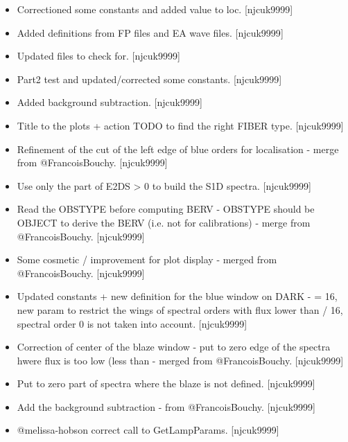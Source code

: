 \documentclass[a4paper,10pt,english]{report}
\begin{document}
\label{\detokenize{misc/changelog:id376}}\begin{itemize}
\item {} 
Correctioned some constants and added value to loc. {[}njcuk9999{]}

\item {} 
Added definitions from FP files and EA wave files. {[}njcuk9999{]}

\item {} 
Updated  files to check for. {[}njcuk9999{]}

\item {} 
Part2 test and updated/corrected some constants. {[}njcuk9999{]}

\item {} 
Added background subtraction. {[}njcuk9999{]}

\item {} 
Title to the plots + action TODO to find the right FIBER type.
{[}njcuk9999{]}

\item {} 
Refinement of the cut of the left edge of blue orders for localisation
- merge from @FrancoisBouchy. {[}njcuk9999{]}

\item {} 
Use only the part of E2DS \textgreater{} 0 to build the S1D spectra. {[}njcuk9999{]}

\item {} 
Read the OBSTYPE before computing BERV - OBSTYPE should be OBJECT to
derive the BERV (i.e. not for calibrations) - merge from
@FrancoisBouchy. {[}njcuk9999{]}

\item {} 
Some cosmetic / improvement for plot display - merged from
@FrancoisBouchy. {[}njcuk9999{]}

\item {} 
Updated constants + new definition for the blue window on DARK -
 = 16, new param to restrict the wings of spectral
orders with flux lower than  / 16, spectral order 0 is
not taken into account. {[}njcuk9999{]}

\item {} 
Correction of center of the blaze window - put to zero edge of the
spectra hwere flux is too low (less than 
 - merged from @FrancoisBouchy. {[}njcuk9999{]}

\item {} 
Put to zero part of spectra where the blaze is not defined.
{[}njcuk9999{]}

\item {} 
Add the background subtraction - from @FrancoisBouchy. {[}njcuk9999{]}

\item {} 
@melissa-hobson correct call to GetLampParams. {[}njcuk9999{]}

\end{itemize}
\end{document}
